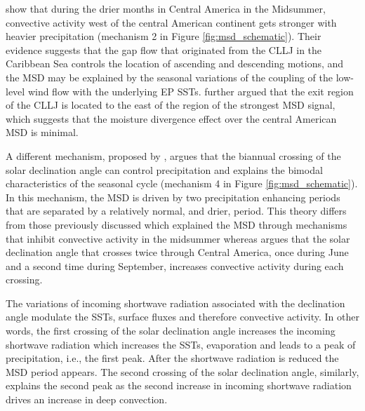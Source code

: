    
 \cite{herrera2015} show that during the drier months in Central America in the Midsummer, convective activity west of the central American continent gets stronger with heavier precipitation (mechanism 2 in Figure \ref{fig:msd_schematic}).  Their evidence suggests that the gap flow that originated from the CLLJ in the Caribbean Sea controls the location of ascending and descending motions, and the MSD may be explained by the seasonal variations of the coupling of the low-level wind flow with the underlying EP SSTs.
\cite{herrera2015} further argued that the exit region of the CLLJ is located to the east of the region of the strongest MSD signal, which suggests that the moisture divergence effect over the central American MSD is minimal. 

A different mechanism, proposed by \cite{karnauskas2013}, argues that the biannual crossing of the solar declination angle can control precipitation and explains the bimodal characteristics of the seasonal cycle (mechanism 4 in Figure \ref{fig:msd_schematic}). In this mechanism, the MSD is driven by two precipitation enhancing periods that are separated by a relatively normal, and drier, period. This theory differs from those previously discussed which explained the MSD through mechanisms that inhibit convective activity in the midsummer whereas \cite{karnauskas2013} argues that the solar declination angle that crosses twice through Central America, once during June and a second time during September, increases convective activity during each crossing. 

The variations of incoming shortwave radiation associated with the declination angle modulate the SSTs, surface fluxes and therefore convective activity. In other words, the first crossing of the solar declination angle increases the incoming shortwave radiation which increases the SSTs, evaporation and leads to a peak of precipitation, i.e., the first peak. After the shortwave radiation is reduced the MSD period appears. The second crossing of the solar declination angle, similarly, explains the second peak as the second increase in incoming shortwave radiation drives an increase in deep convection.%

